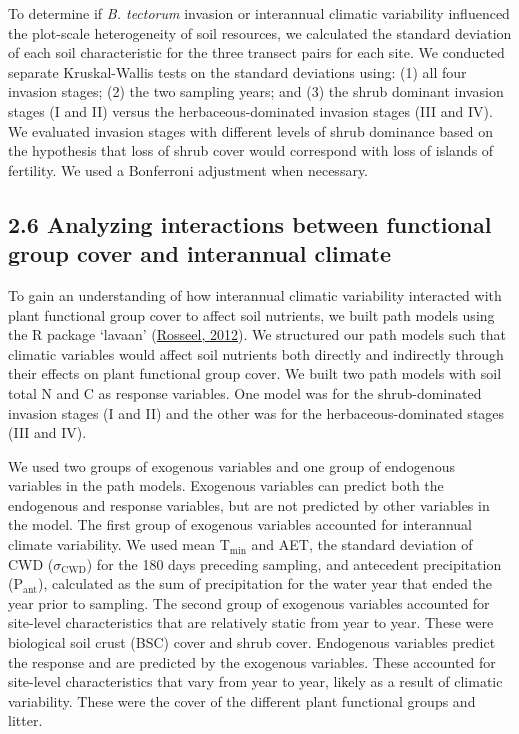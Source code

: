\documentclass[
  11pt,
  a4paper,
]{article}
\begin{document}
To determine if \emph{B. tectorum} invasion or interannual climatic variability influenced the plot-scale heterogeneity of soil resources, we calculated the standard deviation of each soil characteristic for the three transect pairs for each site. We conducted separate Kruskal-Wallis tests on the standard deviations using: (1) all four invasion stages; (2) the two sampling years; and (3) the shrub dominant invasion stages (I and II) versus the herbaceous-dominated invasion stages (III and IV). We evaluated invasion stages with different levels of shrub dominance based on the hypothesis that loss of shrub cover would correspond with loss of islands of fertility. We used a Bonferroni adjustment when necessary.

\hypertarget{analyzing-interactions-between-functional-group-cover-and-interannual-climate}{%
\subsection{2.6 Analyzing interactions between functional group cover and interannual climate}\label{analyzing-interactions-between-functional-group-cover-and-interannual-climate}}

To gain an understanding of how interannual climatic variability interacted with plant functional group cover to affect soil nutrients, we built path models using the R package `lavaan' (\protect\hyperlink{ref-Rosseel2012}{Rosseel, 2012}). We structured our path models such that climatic variables would affect soil nutrients both directly and indirectly through their effects on plant functional group cover. We built two path models with soil total N and C as response variables. One model was for the shrub-dominated invasion stages (I and II) and the other was for the herbaceous-dominated stages (III and IV).

We used two groups of exogenous variables and one group of endogenous variables in the path models. Exogenous variables can predict both the endogenous and response variables, but are not predicted by other variables in the model. The first group of exogenous variables accounted for interannual climate variability. We used mean T\(_\text{min}\) and AET, the standard deviation of CWD (\(\sigma_\text{CWD}\)) for the 180 days preceding sampling, and antecedent precipitation (P\(_\text{ant}\)), calculated as the sum of precipitation for the water year that ended the year prior to sampling. The second group of exogenous variables accounted for site-level characteristics that are relatively static from year to year. These were biological soil crust (BSC) cover and shrub cover. Endogenous variables predict the response and are predicted by the exogenous variables. These accounted for site-level characteristics that vary from year to year, likely as a result of climatic variability. These were the cover of the different plant functional groups and litter.
\end{document}
